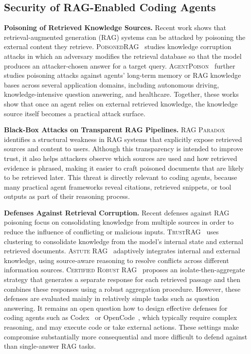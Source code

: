 \subsection{Security of RAG-Enabled Coding Agents}

\noindent \textbf{Poisoning of Retrieved Knowledge Sources.}
Recent work shows that retrieval-augmented generation (RAG) systems
can be attacked by poisoning the external content they retrieve.
\textsc{PoisonedRAG}~\cite{zou2025poisonedrag} studies knowledge corruption attacks
in which an adversary modifies the retrieval database so that the model produces
an attacker-chosen answer for a target query.
\textsc{AgentPoison}~\cite{chen2024agentpoison} further studies poisoning attacks
against agents' long-term memory or RAG knowledge bases across several application domains,
including autonomous driving, knowledge-intensive question answering, and healthcare.
Together, these works show that once an agent relies on external retrieved knowledge,
the knowledge source itself becomes a practical attack surface.

\noindent \textbf{Black-Box Attacks on Transparent RAG Pipelines.}
\textsc{RAG Paradox}~\cite{choi2025rag} identifies a structural
weakness in RAG systems that explicitly expose retrieved sources and content to users.
Although this transparency is intended to improve trust,
it also helps attackers observe which sources are used and how retrieved evidence is phrased,
making it easier to craft poisoned documents that are likely to be retrieved later.
This threat is directly relevant to coding agents,
because many practical agent frameworks reveal citations,
retrieved snippets, or tool outputs as part of their reasoning process.

\noindent \textbf{Defenses Against Retrieval Corruption.}
Recent defenses against RAG poisoning focus on consolidating knowledge
from multiple sources in order to reduce the influence of conflicting or malicious inputs.
\textsc{TrustRAG}~\cite{zhou2025trustrag} uses clustering to consolidate knowledge
from the model's internal state and external retrieved documents.
\textsc{Astute RAG}~\cite{wang2025astute} adaptively integrates internal and external knowledge,
using source-aware reasoning to resolve conflicts across different information sources.
\textsc{Certified Robust RAG}~\cite{xiang2024certifiably} proposes an isolate-then-aggregate strategy
that generates a separate response for each retrieved passage and then combines these
responses using a robust aggregation procedure.
However, these defenses are evaluated mainly in relatively simple tasks such as 
question answering.
It remains an open question how to design effective defenses for coding agents such as 
Codex~\cite{openai_codex_2026} or OpenCode~\cite{opencode_2026},
which typically require complex reasoning, 
and may execute code or take external actions.
These settings make compromise substantially more consequential 
and more difficult to defend against
than single-answer RAG tasks.
